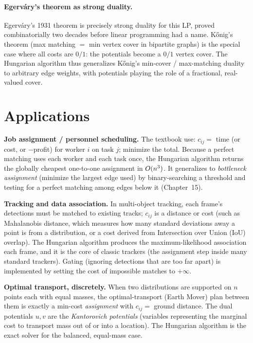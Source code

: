 \paragraph{Egerv\'ary's theorem as strong duality.}
Egerv\'ary's 1931 theorem is precisely strong duality for this LP, proved combinatorially two decades before linear programming had a name. K\H{o}nig's theorem (max matching $=$ min vertex cover in bipartite graphs) is the special case where all costs are $0/1$: the potentials become a $0/1$ vertex cover. The Hungarian algorithm thus generalizes K\H{o}nig's min-cover / max-matching duality to arbitrary edge weights, with potentials playing the role of a fractional, real-valued cover.

\section{Applications}
\label{ch16:apps}

\begin{applicationbox}
\textbf{Job assignment / personnel scheduling.} The textbook use: $c_{ij}=$ time (or cost, or $-$profit) for worker $i$ on task $j$; minimize the total. Because a perfect matching uses each worker and each task once, the Hungarian algorithm returns the globally cheapest one-to-one assignment in $O(n^3)$. It generalizes to \emph{bottleneck assignment} (minimize the largest edge used) by binary-searching a threshold and testing for a perfect matching among edges below it (Chapter~15).
\end{applicationbox}

\begin{applicationbox}
\textbf{Tracking and data association.} In multi-object tracking, each frame's detections must be matched to existing tracks; $c_{ij}$ is a distance or cost (such as Mahalanobis distance, which measures how many standard deviations away a point is from a distribution, or a cost derived from Intersection over Union (IoU) overlap). The Hungarian algorithm produces the maximum-likelihood association each frame, and it is the core of classic trackers (the assignment step inside many standard trackers). Gating (ignoring detections that are too far apart) is implemented by setting the cost of impossible matches to $+\infty$.
\end{applicationbox}

\begin{applicationbox}
\textbf{Optimal transport, discretely.} When two distributions are supported on $n$ points each with equal masses, the optimal-transport (Earth Mover) plan between them is exactly a min-cost \emph{assignment} with $c_{ij}=$ ground distance. The dual potentials $u,v$ are the \emph{Kantorovich potentials} (variables representing the marginal cost to transport mass out of or into a location). The Hungarian algorithm is the exact solver for the balanced, equal-mass case.
\end{applicationbox}

